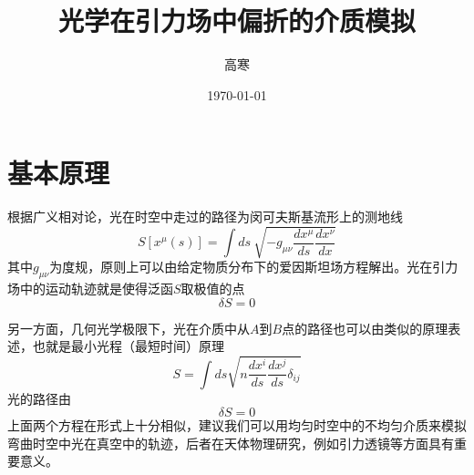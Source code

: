 \documentclass[a4paper,11pt]{ctexart}
\title{光学在引力场中偏折的介质模拟}
\author{高寒}
\date{\today}
\newcommand{\beq}{\begin{equation}}
\newcommand{\eeq}{\end{equation}}
\begin{document}
\tableofcontents
\section{基本原理}
根据广义相对论，光在时空中走过的路径为闵可夫斯基流形上的测地线
\beq
S[x^\mu (s)] = \int ds \ \sqrt{-g_{\mu \nu} \frac{dx^\mu}{ds} \frac{dx^\nu }{dx}}
\eeq
其中$g_{\mu \nu}$为度规，原则上可以由给定物质分布下的爱因斯坦场方程解出。光在引力场中的运动轨迹就是使得泛函$S$取极值的点
\beq
\delta S = 0
\eeq
\par
另一方面，几何光学极限下，光在介质中从$A$到$B$点的路径也可以由类似的原理表述，也就是最小光程（最短时间）原理
\beq
S = \int ds \sqrt{ n \frac{dx^i}{ds} \frac{dx^j}{ds} \delta_{ij}}
\eeq
光的路径由
\beq
\delta S = 0
\eeq
上面两个方程在形式上十分相似，建议我们可以用均匀时空中的不均匀介质来模拟弯曲时空中光在真空中的轨迹，后者在天体物理研究，例如引力透镜等方面具有重要意义。
\end{document}
